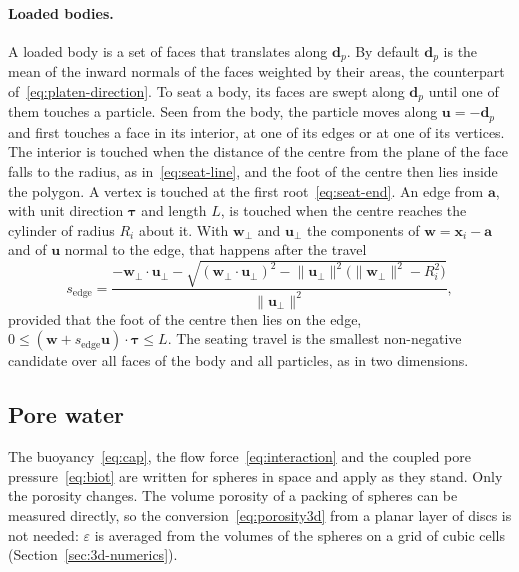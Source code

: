 \paragraph{Loaded bodies.}
A loaded body is a set of faces that translates along $\mathbf{d}_{p}$.
By default $\mathbf{d}_{p}$ is the mean of the inward normals of the faces weighted by their areas, the counterpart of~\eqref{eq:platen-direction}.
To seat a body, its faces are swept along $\mathbf{d}_{p}$ until one of them touches a particle.
Seen from the body, the particle moves along $\mathbf{u}=-\mathbf{d}_{p}$ and first touches a face in its interior, at one of its edges or at one of its vertices.
The interior is touched when the distance of the centre from the plane of the face falls to the radius, as in~\eqref{eq:seat-line}, and the foot of the centre then lies inside the polygon.
A vertex is touched at the first root~\eqref{eq:seat-end}.
An edge from $\mathbf{a}$, with unit direction $\boldsymbol{\tau}$ and length $L$, is touched when the centre reaches the cylinder of radius $R_{i}$ about it.
With $\mathbf{w}_{\perp}$ and $\mathbf{u}_{\perp}$ the components of $\mathbf{w}=\mathbf{x}_{i}-\mathbf{a}$ and of $\mathbf{u}$ normal to the edge, that happens after the travel
\begin{equation}
  s_{\text{edge}}
  = \frac{-\mathbf{w}_{\perp}\cdot\mathbf{u}_{\perp}
          - \sqrt{(\mathbf{w}_{\perp}\cdot\mathbf{u}_{\perp})^{2}
                  - \lVert\mathbf{u}_{\perp}\rVert^{2}\bigl(\lVert\mathbf{w}_{\perp}\rVert^{2}-R_{i}^{2}\bigr)}}
         {\lVert\mathbf{u}_{\perp}\rVert^{2}},
  \label{eq:seat-edge}
\end{equation}
provided that the foot of the centre then lies on the edge, $0\le(\mathbf{w}+s_{\text{edge}}\mathbf{u})\cdot\boldsymbol{\tau}\le L$.
The seating travel is the smallest non-negative candidate over all faces of the body and all particles, as in two dimensions.

\subsection{Pore water}

The buoyancy~\eqref{eq:cap}, the flow force~\eqref{eq:interaction} and the coupled pore pressure~\eqref{eq:biot} are written for spheres in space and apply as they stand.
Only the porosity changes.
The volume porosity of a packing of spheres can be measured directly, so the conversion~\eqref{eq:porosity3d} from a planar layer of discs is not needed: $\varepsilon$ is averaged from the volumes of the spheres on a grid of cubic cells (Section~\ref{sec:3d-numerics}).

